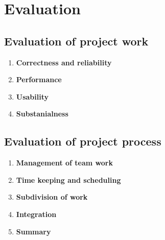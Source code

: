 \section{Evaluation}
\label{sec:evaluation}

\subsection{Evaluation of project work}
\label{sub:evaluation_of_project_work}

\begin{enumerate}

	\item \textbf{Correctness and reliability}

	\item \textbf{Performance}

	\item \textbf{Usability}

	\item \textbf{Substanialness}


\end{enumerate}

\subsection{Evaluation of project process}
\label{sub:evaluation_of_project_process}

\begin{enumerate}

	\item \textbf{Management of team work}

	\item \textbf{Time keeping and scheduling}

	\item \textbf{Subdivision of work}

	\item \textbf{Integration}

	\item \textbf{Summary}

\end{enumerate}
